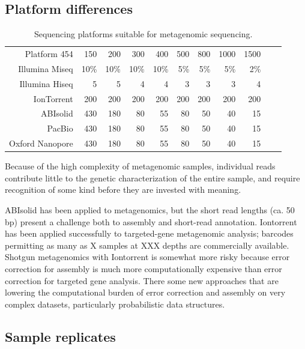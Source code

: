 \documentclass[graybox]{svmult}
\begin{document}
\subsection{Platform differences}

\begin{table}
\caption{Sequencing platforms suitable for metagenomic sequencing.}
\begin{tabular}{rrrrrrrrrrr}
Platform
454  & 150 & 200 & 300 & 400 & 500 & 800 & 1000 & 1500  \\
Illumina Miseq & 10\% & 10\% & 10\% & 10\% & 5\% & 5\% & 5\% & 2\%  \\
Illumina Hiseq & 5 & 5 & 4 & 4 & 3 & 3 & 3 & 4  \\
IonTorrent & 200 & 200 & 200 & 200 & 200 & 200 & 200 & 200  \\
ABIsolid & 430 & 180 & 80 & 55 & 80 & 50 & 40 & 15  \\
PacBio & 430 & 180 & 80 & 55 & 80 & 50 & 40 & 15  \\
Oxford Nanopore  & 430 & 180 & 80 & 55 & 80 & 50 & 40 & 15  \\
\end{tabular}
\end{table}

Because of the high complexity of metagenomic samples, individual reads contribute little to the genetic characterization of the entire sample, and require recognition of some kind before they are invested with meaning.

ABIsolid has been applied to metagenomics, but the short read lengths (ca. 50 bp) present a challenge both to assembly and short-read annotation.
Iontorrent has been applied successfully to targeted-gene metagenomic analysis; barcodes permitting as many as X samples at XXX depths are commercially available.  Shotgun metagenomics with Iontorrent is somewhat more risky because error correction for assembly is much more computationally expensive than error correction for targeted gene analysis.  There some new approaches that are lowering the computational burden of error correction and assembly on very complex datasets, particularly probabilistic data structures.


\subsection{Sample replicates} 
\label{subsec:2}
\end{document}
